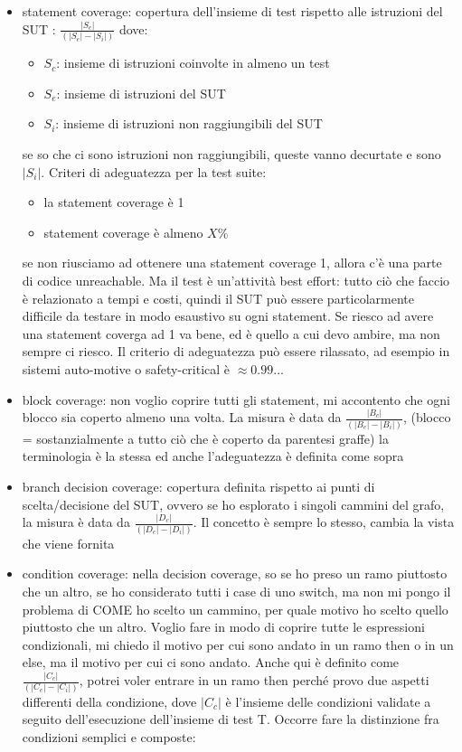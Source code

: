 \documentclass{article}
\begin{document}
\begin{itemize}
\item statement coverage: copertura dell'insieme di test rispetto alle istruzioni del SUT : $\frac{|S_c|}{(|S_e|-|S_i|)}$ dove:
\begin{itemize}
\item $S_c$: insieme di istruzioni coinvolte in almeno un test
\item $S_e$: insieme di istruzioni del SUT
\item $S_i$: insieme di istruzioni non raggiungibili del SUT
\end{itemize}
se so che ci sono istruzioni non raggiungibili, queste vanno decurtate e sono $|S_i|$. Criteri di adeguatezza per la test suite:
\begin{itemize}
\item la statement coverage è 1
\item statement coverage è almeno $X\%$
\end{itemize}
se non riusciamo ad ottenere una statement coverage 1, allora c'è una parte di codice unreachable. Ma il test è un'attività best effort: tutto ciò che faccio è relazionato a tempi e costi, quindi il SUT può essere particolarmente difficile da testare in modo esaustivo su ogni statement. Se riesco ad avere una statement coverga ad 1 va bene, ed è quello a cui devo ambire, ma non sempre ci riesco. Il criterio di adeguatezza può essere rilassato, ad esempio in sistemi auto-motive o safety-critical è $\approx 0.99...$
\item block coverage: non voglio coprire tutti gli statement, mi accontento che ogni blocco sia coperto almeno una volta. La misura è data da $\frac{|B_c|}{(|B_e| - |B_i|)}$, (blocco = sostanzialmente a tutto ciò che è coperto da parentesi graffe) la terminologia è la stessa ed anche l'adeguatezza è definita come sopra
\item branch decision coverage: copertura definita rispetto ai punti di scelta/decisione del SUT, ovvero se ho esplorato i singoli cammini del grafo, la misura è data da $\frac{|D_c|}{(|D_e| - |D_i|)}$. Il concetto è sempre lo stesso, cambia la vista che viene fornita
\item condition coverage: nella decision coverage, so se ho preso un ramo piuttosto che un altro, se ho considerato tutti i case di uno switch, ma non mi pongo il problema di COME ho scelto un cammino, per quale motivo ho scelto quello piuttosto che un altro. Voglio fare in modo di coprire tutte le espressioni condizionali, mi chiedo il motivo per cui sono andato in un ramo then o in un else, ma il motivo per cui ci sono andato. Anche qui è definito come $\frac{|C_c|}{(|C_e| - |C_i|)}$, potrei voler entrare in un ramo then perché provo due aspetti differenti della condizione, dove $|C_c|$ è l'insieme delle condizioni validate a seguito dell'esecuzione dell'insieme di test T. Occorre fare la distinzione fra condizioni semplici e composte:

\end{itemize}
\end{document}

